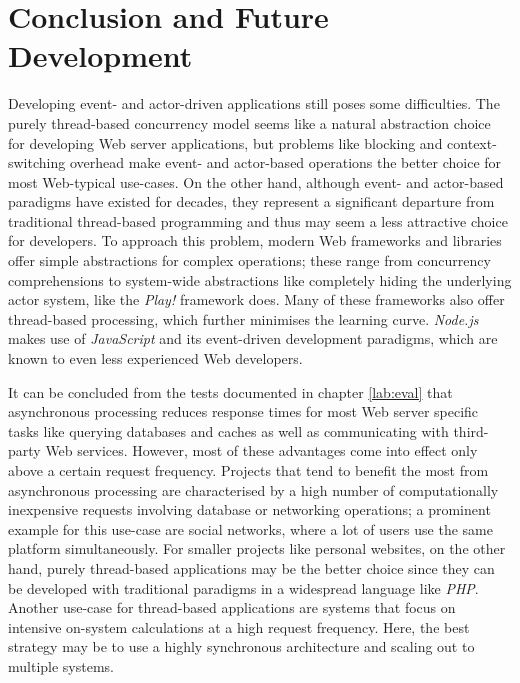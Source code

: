 \chapter{Conclusion and Future Development}
\label{lab:conclusion}
Developing event- and actor-driven applications still poses some difficulties. The purely thread-based concurrency model seems like a natural abstraction choice for developing Web server applications, but problems like blocking and context-switching overhead make event- and actor-based operations the better choice for most Web-typical use-cases. On the other hand, although event- and actor-based paradigms have existed for decades, they represent a significant departure from traditional thread-based programming and thus may seem a less attractive choice for developers. To approach this problem, modern Web frameworks and libraries offer simple abstractions for complex operations; these range from concurrency comprehensions to system-wide abstractions like completely hiding the underlying actor system, like the \textit{Play!} framework does. Many of these frameworks also offer thread-based processing, which further minimises the learning curve. \textit{Node.js} makes use of \textit{JavaScript} and its event-driven development paradigms, which are known to even less experienced Web developers.

It can be concluded from the tests documented in chapter \ref{lab:eval} that asynchronous processing reduces response times for most Web server specific tasks like querying databases and caches as well as communicating with third-party Web services. However, most of these advantages come into effect only above a certain request frequency. Projects that tend to benefit the most from asynchronous processing are characterised by a high number of computationally inexpensive requests involving database or networking operations; a prominent example for this use-case are social networks, where a lot of users use the same platform simultaneously. For smaller projects like personal websites, on the other hand, purely thread-based applications may be the better choice since they can be developed with traditional paradigms in a widespread language like \textit{PHP}. Another use-case for thread-based applications are systems that focus on intensive on-system calculations at a high request frequency. Here, the best strategy may be to use a highly synchronous architecture and scaling out to multiple systems. 

